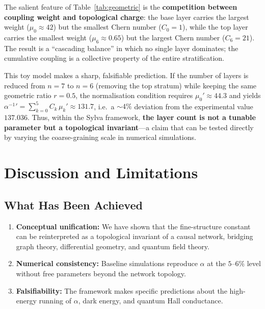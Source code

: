 \documentclass[11pt,a4paper]{article}
\theoremstyle{definition}
\theoremstyle{remark}
\begin{document}
The salient feature of Table~\ref{tab:geometric} is the \textbf{competition
between coupling weight and topological charge}: the base layer carries the
largest weight ($\mu_{0}\approx 42$) but the smallest Chern number
($C_{0}=1$), while the top layer carries the smallest weight
($\mu_{6}\approx 0.65$) but the largest Chern number ($C_{6}=21$).  The
result is a ``cascading balance'' in which no single layer dominates; the
cumulative coupling is a collective property of the entire stratification.

This toy model makes a sharp, falsifiable prediction.  If the number of
layers is reduced from $n=7$ to $n=6$ (removing the top stratum) while
keeping the same geometric ratio $r=0.5$, the normalisation condition
requires $\mu_{0}'\approx 44.3$ and yields
$\alpha^{-1}{}'=\sum_{k=0}^{5}C_{k}\,\mu_{k}'\approx 131.7$, i.e.\ a
$\sim 4\%$ deviation from the experimental value $137.036$.  Thus, within
the Sylva framework, \textbf{the layer count is not a tunable parameter but
a topological invariant}---a claim that can be tested directly by varying
the coarse-graining scale in numerical simulations.

\section{Discussion and Limitations}\label{sec:discussion}

\subsection{What Has Been Achieved}\label{subsec:achieved}

\begin{enumerate}[noitemsep]
\item \textbf{Conceptual unification:} We have shown that the fine-structure
constant can be reinterpreted as a topological invariant of a causal network,
bridging graph theory, differential geometry, and quantum field theory.
\item \textbf{Numerical consistency:} Baseline simulations reproduce $\alpha$ at
the $5\text{--}6\%$ level without free parameters beyond the network topology.
\item \textbf{Falsifiability:} The framework makes specific predictions about the
high-energy running of $\alpha$, dark energy, and quantum Hall conductance.
\end{enumerate}
\end{document}
